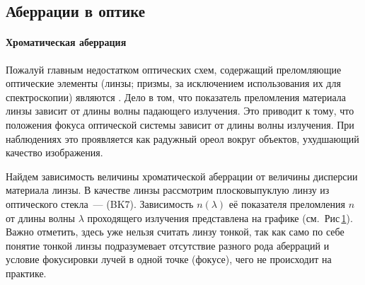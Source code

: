 \subsection{Аберрации в оптике}
\paragraph{Хроматическая аберрация}
Пожалуй главным недостатком оптических схем, содержащий преломляющие оптические элементы (линзы; призмы, за исключением использования их для спектроскопии) являются . Дело в том, что показатель преломления материала линзы зависит от длины волны падающего излучения. Это приводит к тому, что положения фокуса оптической системы зависит от длины волны излучения. При наблюдениях это проявляется как радужный ореол вокруг объектов, ухудшающий качество изображения.

\begin{figure}
	\centering
	\vspace{-1pc}
	\caption{}
	\label{pic:crown-dispersion}
\end{figure}
Найдем зависимость величины хроматической аберрации от величины дисперсии материала линзы. В качестве линзы рассмотрим плосковыпуклую линзу из оптического стекла~---  (BK7). Зависимость $n(\lambda)$ её показателя преломления $n$ от длины волны $\lambda$ проходящего излучения представлена на графике (см.~Рис\,\ref{pic:crown-dispersion}). Важно отметить, здесь уже нельзя считать линзу тонкой, так как само по себе понятие тонкой линзы подразумевает отсутствие разного рода аберраций и условие фокусировки лучей в одной точке (фокусе), чего не происходит на практике.

